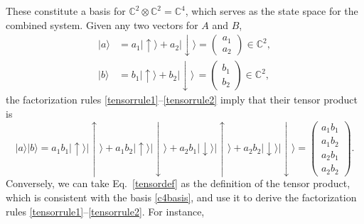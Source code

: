 \documentclass[pra,12pt]{revtex4-2}
\begin{document}
These constitute a basis for $\mathbb{C}^2 \otimes \mathbb{C}^2 =
\mathbb{C}^4$, which serves as the state space for the combined
system.  Given any two vectors for $A$ and $B$,
\begin{align}
  |a\rangle &=
  a_1 |\!\uparrow\rangle + a_2 |\!\downarrow\rangle =
  \begin{pmatrix} a_1 \\ a_2 \end{pmatrix} \in \mathbb{C}^2, \\
  |b\rangle &=
  b_1 |\!\uparrow\rangle + b_2 |\!\downarrow\rangle \,=
  \begin{pmatrix} b_1 \\ b_2 \end{pmatrix} \in \mathbb{C}^2,
\end{align}
the factorization rules \eqref{tensorrule1}--\eqref{tensorrule2} imply
that their tensor product is
\begin{equation}
  |a\rangle |b\rangle =
  a_1 b_1 |\!\uparrow\rangle |\!\uparrow\rangle
  + a_1 b_2 |\!\uparrow\rangle |\!\downarrow\rangle
  + a_2 b_1 |\!\downarrow\rangle |\!\uparrow\rangle
  + a_2 b_2 |\!\downarrow\rangle |\!\downarrow\rangle
  =
  \begin{pmatrix} a_1 b_1 \\ a_1 b_2 \\ a_2 b_1 \\ a_2 b_2 \end{pmatrix}.
  \label{tensordef}
\end{equation}
Conversely, we can take Eq.~\eqref{tensordef} as the definition of the
tensor product, which is consistent with the basis \eqref{c4basis},
and use it to derive the factorization rules
\eqref{tensorrule1}--\eqref{tensorrule2}.  For instance,
\end{document}
